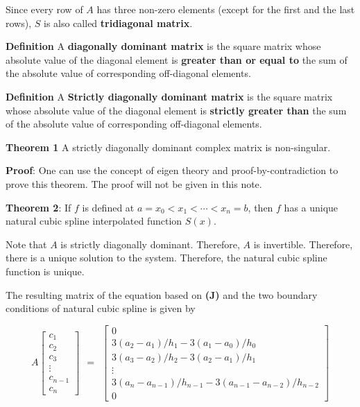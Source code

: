 \documentclass[
]{book}
\begin{document}
Since every row of \(A\) has three non-zero elements (except for the first and the last rows), \(S\) is also called \textbf{\color{red}tridiagonal matrix}.

\hfill\break

\textbf{Definition} A \textbf{\color{red}diagonally dominant matrix} is the square matrix whose absolute value of the diagonal element is \textbf{greater than or equal to} the sum of the absolute value of corresponding off-diagonal elements.

\hfill\break

\textbf{Definition} A \textbf{\color{red} Strictly diagonally dominant matrix} is the square matrix whose absolute value of the diagonal element is \textbf{strictly greater than} the sum of the absolute value of corresponding off-diagonal elements.

\hfill\break

\textbf{Theorem 1} A strictly diagonally dominant complex matrix is non-singular.

\textbf{Proof}: One can use the concept of eigen theory and proof-by-contradiction to prove this theorem. The proof will not be given in this note.

\hfill\break

\textbf{Theorem 2}: If \(f\) is defined at \(a = x_0 < x_1 < \cdots < x_n = b\), then \(f\) has a unique natural cubic spline interpolated function \(S(x)\).

Note that \(A\) is strictly diagonally dominant. Therefore, \(A\) is invertible. Therefore, there is a unique solution to the system. Therefore, the natural cubic spline function is unique.

\hfill\break

The resulting matrix of the equation based on \textbf{(J)} and the two boundary conditions of natural cubic spline is given by

\[
A
\left[
\begin{array}{c}
c_1 \\
c_2 \\
c_3 \\
\vdots\\
c_{n-1}\\
c_n
\end{array}
\right]
~~=~~
\left[
\begin{array}{c}
0 \\
3(a_2-a_1)/h_1 - 3(a_1-a_0)/h_0 \\
3(a_3-a_2)/h_2 - 3(a_2-a_1)/h_1 \\
\vdots\\
3(a_n-a_{n-1})/h_{n-1} - 3(a_{n-1}-a_{n-2})/h_{n-2} \\
0
\end{array}
\right]
\]
\end{document}
